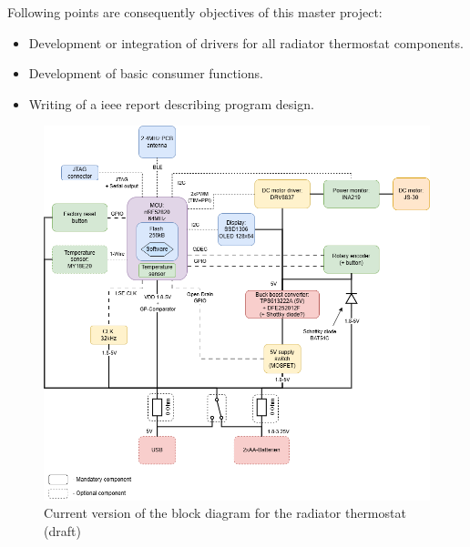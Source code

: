 Following points are consequently objectives of this master project:

\begin{itemize}
	\item Development or integration of drivers for all radiator thermostat components.
	\item Development of basic consumer functions.
	\item Writing of a \acs{ieee} report describing program design.
\end{itemize}

\newpage

\begin{figure}[p]
	\centering
	\includegraphics[width=1.0\linewidth]{../../electronics/mt-rt-block-diagram.png}
	\caption{Current version of the block diagram for the radiator thermostat (draft)}
	\label{fig:mt-rt-block-diagram}
\end{figure}

\newpage

